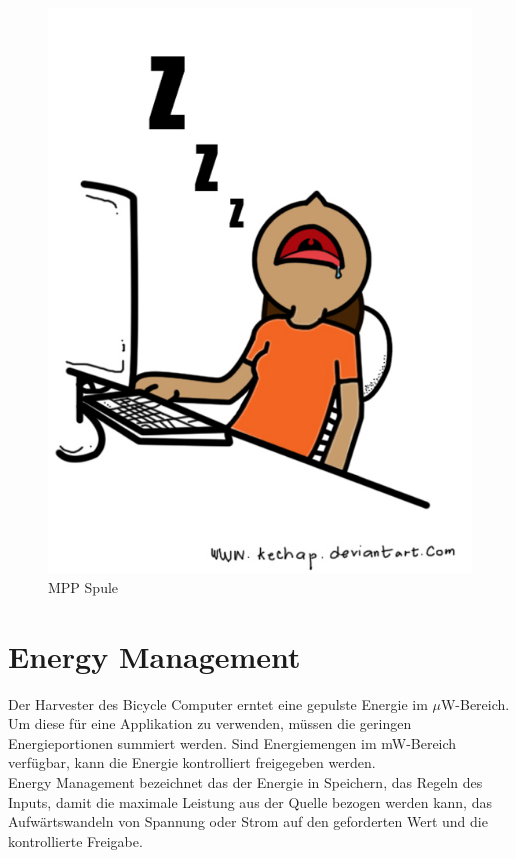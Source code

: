 \begin{figure}
   \includegraphics{Idle.jpg}
   \caption{MPP Spule}\label{mpp_harvester} 
\end{figure}

\cite{MPP_Harv}


\section{Energy Management}\label{t_energy_management} 
Der Harvester des Bicycle Computer erntet eine gepulste Energie im $\mu$W-Bereich. Um diese für eine Applikation zu verwenden, müssen die geringen Energieportionen summiert werden. Sind Energiemengen im mW-Bereich verfügbar, kann die Energie kontrolliert freigegeben werden.\\


Energy Management bezeichnet das der Energie in Speichern, das Regeln des Inputs, damit die maximale Leistung aus der Quelle bezogen werden kann, das Aufwärtswandeln von Spannung oder Strom auf den geforderten Wert und die kontrollierte Freigabe.\\

